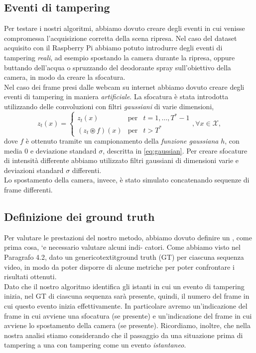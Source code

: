 \subsection{Eventi di tampering}
Per testare i nostri algoritmi, abbiamo dovuto creare degli eventi in cui venisse compromessa l'acquisizione corretta della scena ripresa.
Nel caso del dataset acquisito con il Raspberry Pi abbiamo potuto introdurre degli eventi di tampering \textit{reali}, ad esempio spostando la camera durante la ripresa, oppure buttando dell'acqua o spruzzando del deodorante spray sull'obiettivo della camera, in modo da creare la sfocatura.\\
Nel caso dei frame presi dalle webcam su internet abbiamo dovuto creare degli eventi di tampering in maniera \textit{artificiale}.
La sfocatura \`e stata introdotta utilizzando delle convoluzioni con filtri \textit{gaussiani} di varie dimensioni,
\[z_t(x) = \left\{ \begin{array}{ccl}
z_t(x) & \mbox{per} & t=1,\dots,T^* -1 \\
(z_t \circledast f)(x) & \mbox{per} & t > T^* 
\end{array}\right. , \forall x \in \mathcal{X},\]
dove $f$ \`e ottenuto tramite un campionamento della \textit{funzione gaussiana} $h$, con media $0$ e deviazione standard $\sigma$, descritta in \eqref{eq:gaussian}.
Per creare sfocature di intensit\`a differente abbiamo utilizzato filtri gaussiani di dimensioni varie e deviazioni standard $\sigma$ differenti.\\
Lo spostamento della camera, invece, \`e stato simulato concatenando sequenze di frame differenti.
\subsection{Definizione dei ground truth}
Per valutare le prestazioni del nostro metodo, abbiamo dovuto definire un \costruzione, come prima cosa, `e necessario valutare alcuni indi-
catori. Come abbiamo visto nel Paragrafo 4.2, dato un genericotextit{ground truth} (GT) per ciascuna sequenza video, in modo da poter disporre di alcune metriche per poter confrontare i risultati ottenuti.\\
Dato che il nostro algoritmo identifica gli istanti in cui un evento di tampering inizia, nel GT di ciascuna sequenza sar\`a presente, quindi, il numero del frame in cui questo evento inizia effettivamente. 
In particolare avremo un'indicazione del frame in cui avviene una sfocatura (se presente) e un'indicazione del frame in cui avviene lo spostamento della camera (se presente).
Ricordiamo, inoltre, che nella nostra analisi stiamo considerando che il passaggio da una situazione prima di tampering a una con tampering come un evento \textit{istantaneo}. 

